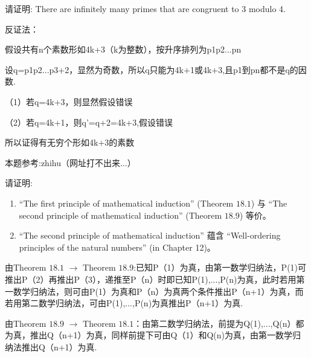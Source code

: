 \documentclass[a4paper, justified]{tufte-handout}
\begin{document}
\begin{problem}
  请证明: There are infinitely many primes 
  that are congruent to 3 modulo 4.
\end{problem}

\begin{solution}
\quad  反证法：

假设共有n个素数形如4k+3（k为整数），按升序排列为p1p2...pn

设q=p1p2...p3+2，显然为奇数，所以q只能为4k+1或4k+3,且p1到pn都不是q的因数.

（1）若q=4k+3，则显然假设错误

（2）若q=4k+1，则q'=q+2=4k+3,假设错误

所以证得有无穷个形如4k+3的素数

本题参考:zhihu（网址打不出来...）

\end{solution}

\begin{problem}
  请证明: 
  \begin{enumerate}[(1)]
    \item ``The first principle of mathematical induction'' (Theorem $18.1$)
      与 ``The second principle of mathematical induction'' (Theorem $18.9$) 等价。
    \item ``The second principle of mathematical induction'' 蕴含 
      ``Well-ordering principles of the natural numbers'' (in Chapter 12)。
  \end{enumerate}
\end{problem}

\begin{solution}
\quad 由Theorem $18.1$ $\rightarrow$ Theorem $18.9$:已知P（1）为真，由第一数学归纳法，P(1)可推出P（2）再推出P（3），递推至P（n）时即已知P(1),...,P(n)为真，此时若用第一数学归纳法，则可由P(1）为真和P（n）为真两个条件推出P（n+1）为真，而若用第二数学归纳法，可由P(1),...,P(n)为真推出P（n+1）为真.

由Theorem $18.9$ $\rightarrow$ Theorem $18.1$：由第二数学归纳法，前提为Q(1),...,Q(n）都为真，推出Q（n+1）为真，同样前提下可由Q（1）和Q(n)为真，由第一数学归纳法推出Q（n+1）为真.

\end{solution}
\end{document}

